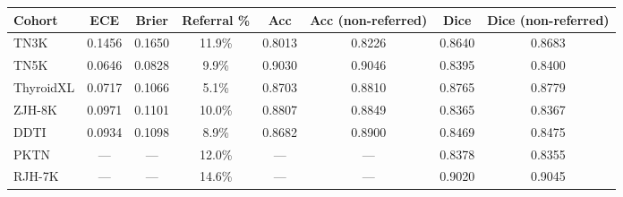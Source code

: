 \begin{responsetable}
\caption{}
\begin{adjustbox}{max width=\textwidth,center}
\scriptsize
\begin{tabular}{lccccccc}
\toprule
Cohort & ECE & Brier & Referral \% & Acc & Acc (non-referred) & Dice & Dice (non-referred) \\
\midrule
TN3K & 0.1456 & 0.1650 & 11.9\% & 0.8013 & 0.8226 & 0.8640 & 0.8683 \\
TN5K & 0.0646 & 0.0828 & 9.9\% & 0.9030 & 0.9046 & 0.8395 & 0.8400 \\
ThyroidXL & 0.0717 & 0.1066 & 5.1\% & 0.8703 & 0.8810 & 0.8765 & 0.8779 \\
ZJH-8K & 0.0971 & 0.1101 & 10.0\% & 0.8807 & 0.8849 & 0.8365 & 0.8367 \\
DDTI & 0.0934 & 0.1098 & 8.9\% & 0.8682 & 0.8900 & 0.8469 & 0.8475 \\
PKTN & --- & --- & 12.0\% & --- & --- & 0.8378 & 0.8355 \\
RJH-7K & --- & --- & 14.6\% & --- & --- & 0.9020 & 0.9045 \\
\bottomrule
\end{tabular}
\end{adjustbox}
\end{responsetable}

